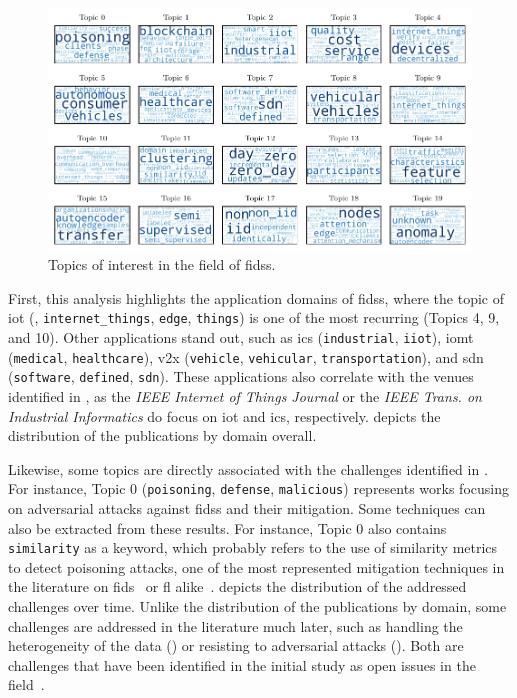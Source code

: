 \begin{figure}
  \centering
  \includegraphics[width=\textwidth]{figures/topic_clouds.pdf}
  \caption{
    Topics of interest in the field of \glspl{fids}.
    \label{fig:sota.topics}
  }
\end{figure}

First, this analysis highlights the application domains of \glspl{fids}, where the topic of \gls{iot} (\ie, \texttt{internet\_things}, \texttt{edge}, \texttt{things}) is one of the most recurring (Topics 4, 9, and 10).
Other applications stand out, such as \gls{ics} (\texttt{industrial}, \texttt{iiot}), \gls{iomt} (\texttt{medical}, \texttt{healthcare}), \gls{v2x} (\texttt{vehicle}, \texttt{vehicular}, \texttt{transportation}), and \gls{sdn} (\texttt{software}, \texttt{defined}, \texttt{sdn}).
These applications also correlate with the venues identified in , as the \emph{IEEE Internet of Things Journal} or the \emph{IEEE Trans. on Industrial Informatics} do focus on \gls{iot} and \gls{ics}, respectively.
 depicts the distribution of the publications by domain overall.

Likewise, some topics are directly associated with the challenges identified in .
For instance, Topic 0 (\texttt{poisoning}, \texttt{defense}, \texttt{malicious}) represents works focusing on adversarial attacks against \glspl{fids} and their mitigation. 
Some techniques can also be extracted from these results.
For instance, Topic 0 also contains \texttt{similarity} as a keyword, which probably refers to the use of similarity metrics to detect poisoning attacks, one of the most represented mitigation techniques in the literature on \gls{fids}~\cite{yang_Dependablefederatedlearning_2023} or \gls{fl} alike~\cite{fung_LimitationsFederatedLearning_2020,nguyen_FLAMETamingBackdoors_2022}.
 depicts the distribution of the addressed challenges over time.
Unlike the distribution of the publications by domain, some challenges are addressed in the literature much later, such as handling the heterogeneity of the data () or resisting to adversarial attacks ().
Both are challenges that have been identified in the initial study as open issues in the field~\cite{lavaur_EvolutionFederatedLearningbased_2022,lavaur_Federatedlearningenabler_2022}.

